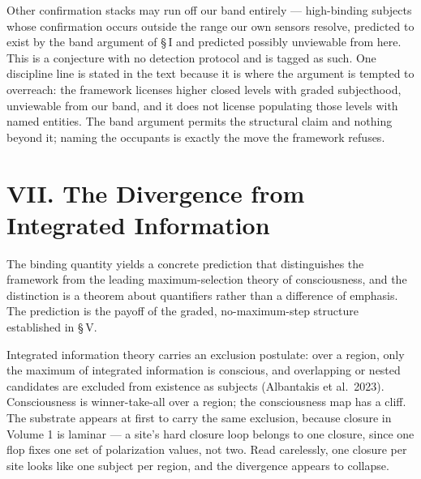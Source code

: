 \documentclass[11pt,oneside]{report}
\theoremstyle{definition}
\theoremstyle{remark}
\begin{document}
Other confirmation stacks may run off our band entirely --- high-binding
subjects whose confirmation occurs outside the range our own sensors
resolve, predicted to exist by the band argument of \S\,I and predicted
possibly unviewable from here. This is a conjecture with no detection
protocol and is tagged as such. One discipline line is stated in the text
because it is where the argument is tempted to overreach: the framework
licenses higher closed levels with graded subjecthood, unviewable from
our band, and it does not license populating those levels with named
entities. The band argument permits the structural claim and nothing
beyond it; naming the occupants is exactly the move the framework
refuses.

\section*{VII. The Divergence from Integrated Information}

The binding quantity yields a concrete prediction that distinguishes the
framework from the leading maximum-selection theory of consciousness, and
the distinction is a theorem about quantifiers rather than a difference of
emphasis. The prediction is the payoff of the graded, no-maximum-step
structure established in \S\,V.

Integrated information theory carries an exclusion postulate: over a
region, only the maximum of integrated information is conscious, and
overlapping or nested candidates are excluded from existence as subjects
(Albantakis et al.\ 2023). Consciousness is winner-take-all over a region;
the consciousness map has a cliff. The substrate appears at first to carry
the same exclusion, because closure in Volume 1 is laminar --- a site's
hard closure loop belongs to one closure, since one flop fixes one set of
polarization values, not two. Read carelessly, one closure per site looks
like one subject per region, and the divergence appears to collapse.
\end{document}
